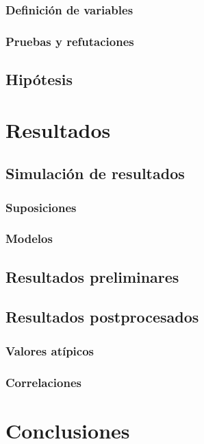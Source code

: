 \documentclass[12pt]{book}
\begin{document}
\subsection{Definición de variables}
\subsection{Pruebas y refutaciones}
\section{Hipótesis}
\chapter{Resultados}
\section{Simulación de resultados}
\subsection{Suposiciones}
\subsection{Modelos}
\section{Resultados preliminares}
\section{Resultados postprocesados}
\subsection{Valores atípicos}
\subsection{Correlaciones}
\chapter{Conclusiones}
\end{document}
